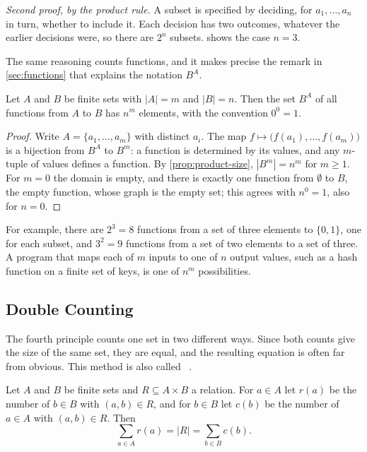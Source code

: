\emph{Second proof, by the product rule.} A subset is specified by deciding, for $a_1,\ldots,a_n$ in turn, whether to include it. Each decision has two outcomes, whatever the earlier decisions were, so there are $2^n$ subsets.  shows the case $n=3$.

The same reasoning counts functions, and it makes precise the remark in \cref{sec:functions} that explains the notation $B^A$.

\begin{proposition}
\label{prop:functions-count}
Let $A$ and $B$ be finite sets with $|A|=m$ and $|B|=n$. Then the set $B^A$ of all functions from $A$ to $B$ has $n^m$ elements, with the convention $0^0=1$.
\end{proposition}

\begin{proof}
Write $A=\{a_1,\ldots,a_m\}$ with distinct $a_i$. The map $f\mapsto\bigl(f(a_1),\ldots,f(a_m)\bigr)$ is a bijection from $B^A$ to $B^m$: a function is determined by its values, and any $m$-tuple of values defines a function. By \cref{prop:product-size}, $|B^m|=n^m$ for $m\ge1$. For $m=0$ the domain is empty, and there is exactly one function from $\emptyset$ to $B$, the empty function, whose graph is the empty set; this agrees with $n^0=1$, also for $n=0$.
\end{proof}

For example, there are $2^{3}=8$ functions from a set of three elements to $\{0,1\}$, one for each subset, and $3^{2}=9$ functions from a set of two elements to a set of three. A program that maps each of $m$ inputs to one of $n$ output values, such as a hash function on a finite set of keys, is one of $n^m$ possibilities.

\subsection{Double Counting}

The fourth principle counts one set in two different ways. Since both counts give the size of the same set, they are equal, and the resulting equation is often far from obvious. This method is also called ~\cite{aigner2018proofs,vanlint2001}.

\begin{proposition}
\label{prop:double-counting}
Let $A$ and $B$ be finite sets and $R\subseteq A\times B$ a relation. For $a\in A$ let $r(a)$ be the number of $b\in B$ with $(a,b)\in R$, and for $b\in B$ let $c(b)$ be the number of $a\in A$ with $(a,b)\in R$. Then
\[
\sum_{a\in A}r(a)=|R|=\sum_{b\in B}c(b).
\]
\end{proposition}

